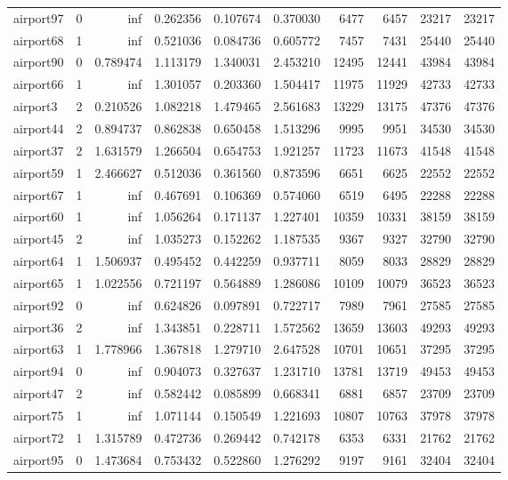\begin{longtable}{|l|r|r|r|r|r|r|r|r|r|}
airport97 & 0 & inf & 0.262356 & 0.107674 & 0.370030 & 6477 & 6457 & 23217 & 23217 \\
airport68 & 1 & inf & 0.521036 & 0.084736 & 0.605772 & 7457 & 7431 & 25440 & 25440 \\
airport90 & 0 & 0.789474 & 1.113179 & 1.340031 & 2.453210 & 12495 & 12441 & 43984 & 43984 \\
airport66 & 1 & inf & 1.301057 & 0.203360 & 1.504417 & 11975 & 11929 & 42733 & 42733 \\
airport3 & 2 & 0.210526 & 1.082218 & 1.479465 & 2.561683 & 13229 & 13175 & 47376 & 47376 \\
airport44 & 2 & 0.894737 & 0.862838 & 0.650458 & 1.513296 & 9995 & 9951 & 34530 & 34530 \\
airport37 & 2 & 1.631579 & 1.266504 & 0.654753 & 1.921257 & 11723 & 11673 & 41548 & 41548 \\
airport59 & 1 & 2.466627 & 0.512036 & 0.361560 & 0.873596 & 6651 & 6625 & 22552 & 22552 \\
airport67 & 1 & inf & 0.467691 & 0.106369 & 0.574060 & 6519 & 6495 & 22288 & 22288 \\
airport60 & 1 & inf & 1.056264 & 0.171137 & 1.227401 & 10359 & 10331 & 38159 & 38159 \\
airport45 & 2 & inf & 1.035273 & 0.152262 & 1.187535 & 9367 & 9327 & 32790 & 32790 \\
airport64 & 1 & 1.506937 & 0.495452 & 0.442259 & 0.937711 & 8059 & 8033 & 28829 & 28829 \\
airport65 & 1 & 1.022556 & 0.721197 & 0.564889 & 1.286086 & 10109 & 10079 & 36523 & 36523 \\
airport92 & 0 & inf & 0.624826 & 0.097891 & 0.722717 & 7989 & 7961 & 27585 & 27585 \\
airport36 & 2 & inf & 1.343851 & 0.228711 & 1.572562 & 13659 & 13603 & 49293 & 49293 \\
airport63 & 1 & 1.778966 & 1.367818 & 1.279710 & 2.647528 & 10701 & 10651 & 37295 & 37295 \\
airport94 & 0 & inf & 0.904073 & 0.327637 & 1.231710 & 13781 & 13719 & 49453 & 49453 \\
airport47 & 2 & inf & 0.582442 & 0.085899 & 0.668341 & 6881 & 6857 & 23709 & 23709 \\
airport75 & 1 & inf & 1.071144 & 0.150549 & 1.221693 & 10807 & 10763 & 37978 & 37978 \\
airport72 & 1 & 1.315789 & 0.472736 & 0.269442 & 0.742178 & 6353 & 6331 & 21762 & 21762 \\
airport95 & 0 & 1.473684 & 0.753432 & 0.522860 & 1.276292 & 9197 & 9161 & 32404 & 32404 \\

\end{longtable}
